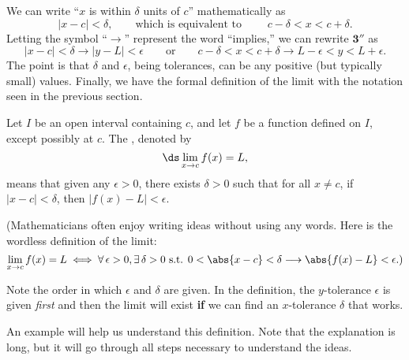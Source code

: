 We can write ``$x$ is within $\delta$ units of $c$'' mathematically as
$$|x-c| < \delta, \qquad \text{which is equivalent to }\qquad c-\delta < x < c+\delta.$$
Letting the symbol ``$\longrightarrow$'' represent the word ``implies,'' we can rewrite $\textbf{3}''$ as 
$$
|x - c| < \delta \longrightarrow  |y - L| < \epsilon 
\qquad \textrm{or} \qquad c - \delta < x < c + \delta \longrightarrow L - \epsilon < y < L + \epsilon.
$$
The point is that $\delta$ and $\epsilon$, being tolerances, can be any positive (but typically small) values.  Finally, we have the formal definition of the limit with the notation  seen in the previous section.

{Let $I$ be an open interval containing $c$, and let $f$ be a function defined on $I$, except possibly at $c$. The , denoted by
\[\ds\lim_{x\rightarrow c} f(x) = L,\]
means that given any $\epsilon > 0$, there exists $\delta > 0$ such that for all $x\neq c$,  
if  $|x - c| < \delta$, then $|f(x) - L| < \epsilon$.
}

(Mathematicians often enjoy writing ideas without using any words. Here is the wordless definition of the limit:
\[
\lim_{x\to c} f(x) = L \iff
\forall \, \epsilon > 0, \exists \, \delta > 0 \text{ s.t. }
0<\abs{x - c} < \delta \longrightarrow \abs{f(x) - L} < \epsilon\text{.)}
\]

Note the order in which $\epsilon$ and $\delta$ are given.  In the definition, the $y$-tolerance $\epsilon$ is given \textit{first} and then the limit will exist \textbf{if} we can find an $x$-tolerance $\delta$ that works.


An example will help us understand this definition.  Note that the explanation is long, but it will go through all steps necessary to understand the ideas.\\

